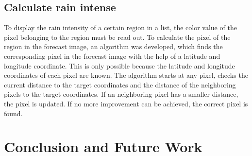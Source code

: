 \documentclass[oneside]{htwg-report}
\begin{document}
\subsection*{Calculate rain intense}
    \begin{sloppypar}
        To display the rain intensity of a certain region in a list, the color value of the pixel belonging to the region must be read out. 
        To calculate the pixel of the region in the forecast image, an algorithm was developed, which finds the corresponding pixel in the forecast image with the help of a latitude and longitude coordinate. 
        This is only possible because the latitude and longitude coordinates of each pixel are known. 
        The algorithm starts at any pixel, checks the current distance to the target coordinates and the distance of the neighboring pixels to the target coordinates. 
        If an neighboring pixel has a smaller distance, the pixel is updated. If no more improvement can be achieved, the correct pixel is found. 
    \end{sloppypar}


\section*{Conclusion and Future Work}
\end{document}
